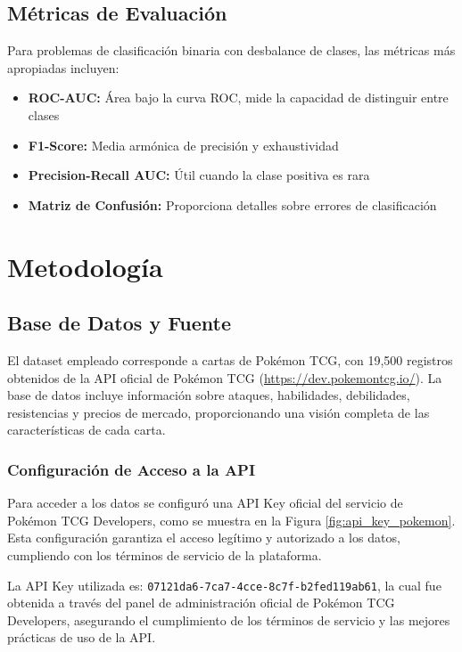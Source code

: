 \documentclass[12pt,letterpaper]{article}
\begin{document}
\subsection{Métricas de Evaluación}

Para problemas de clasificación binaria con desbalance de clases, las métricas más apropiadas incluyen:

\begin{itemize}
    \item \textbf{ROC-AUC:} Área bajo la curva ROC, mide la capacidad de distinguir entre clases
    \item \textbf{F1-Score:} Media armónica de precisión y exhaustividad
    \item \textbf{Precision-Recall AUC:} Útil cuando la clase positiva es rara
    \item \textbf{Matriz de Confusión:} Proporciona detalles sobre errores de clasificación
\end{itemize}

\section{Metodología}

\subsection{Base de Datos y Fuente}

El dataset empleado corresponde a cartas de Pokémon TCG, con 19,500 registros obtenidos de la API oficial de Pokémon TCG (\url{https://dev.pokemontcg.io/}). La base de datos incluye información sobre ataques, habilidades, debilidades, resistencias y precios de mercado, proporcionando una visión completa de las características de cada carta.

\subsubsection{Configuración de Acceso a la API}

Para acceder a los datos se configuró una API Key oficial del servicio de Pokémon TCG Developers, como se muestra en la Figura \ref{fig:api_key_pokemon}. Esta configuración garantiza el acceso legítimo y autorizado a los datos, cumpliendo con los términos de servicio de la plataforma.

La API Key utilizada es: \texttt{07121da6-7ca7-4cce-8c7f-b2fed119ab61}, la cual fue obtenida a través del panel de administración oficial de Pokémon TCG Developers, asegurando el cumplimiento de los términos de servicio y las mejores prácticas de uso de la API.
\end{document}
